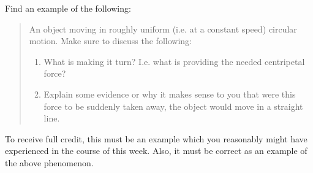 \documentclass{reflection}
\begin{document}
\maketitle

Find an example of the following:
\begin{quote}
    An object moving in roughly uniform (i.e. at a constant speed) circular motion. Make sure to discuss the following:
    \begin{enumerate}
        \item What is making it turn? I.e. what is providing the needed centripetal force?
        \item Explain some evidence or why it makes sense to you that were this force to be suddenly taken away, the object would move in a straight line.
    \end{enumerate}
\end{quote}

To receive full credit, this must be an example which you reasonably might have experienced in the course of this week. Also, it must be correct as an example of the above phenomenon.

\end{document}
